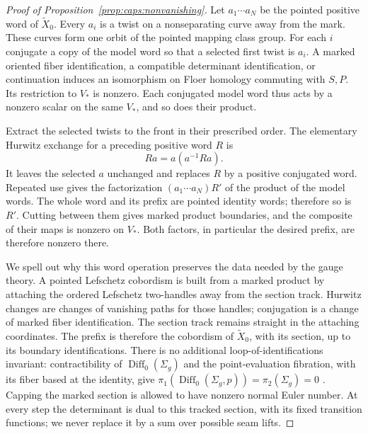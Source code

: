 \begin{proof}[Proof of Proposition~\ref{prop:caps:nonvanishing}]
Let $a_1\cdots a_N$ be the pointed positive word of
$\widetilde X_0$.  Every $a_i$ is a twist on a nonseparating curve away
from the mark.  These curves form one orbit of the pointed mapping class
group.  For each $i$ conjugate a copy of the model word so that a selected
first twist is $a_i$.  A marked oriented fiber identification, a compatible
determinant identification, or continuation induces an isomorphism on
Floer homology commuting with $S,P$.  Its restriction to $V_*$ is
nonzero.  Each conjugated model word thus acts by a nonzero scalar on the
same $V_*$, and so does their product.

Extract the selected twists to the front in their prescribed order.
The elementary Hurwitz exchange for a preceding positive word $R$ is
\begin{equation}\label{eq:caps:hurwitz}
                         Ra=a(a^{-1}Ra).
\end{equation}
It leaves the selected $a$ unchanged and replaces $R$ by a positive
conjugated word.  Repeated use gives the factorization
$(a_1\cdots a_N)R'$ of the product of the model words.  The whole word
and its prefix are pointed identity words; therefore so is $R'$.
Cutting between them gives marked product boundaries, and the composite
of their maps is nonzero on $V_*$.  Both factors, in particular the
desired prefix, are therefore nonzero there.

We spell out why this word operation preserves the data needed by the
gauge theory.  A pointed Lefschetz cobordism is built from a marked product
by attaching the ordered Lefschetz two-handles away from the section
track.  Hurwitz changes are changes of vanishing paths for those handles;
conjugation is a change of marked fiber identification.  The section
track remains straight in the attaching coordinates.  The prefix is
therefore the cobordism of $\widetilde X_0$, with its section, up to its
boundary identifications.  There is no additional loop-of-identifications
invariant: contractibility of $\operatorname{Diff}_0(\Sigma_g)$ and
the point-evaluation fibration, with its fiber based at the identity, give
$\pi_1(\operatorname{Diff}_0(\Sigma_g,p))=\pi_2(\Sigma_g)=0$
\cite[Theorem~1 and Section~1.1, Proposition~1]{Gramain1973}.
Capping the marked section is allowed to have nonzero normal Euler
number.  At every step the determinant is dual to this tracked section,
with its fixed transition functions; we never replace it by a sum over
possible seam lifts.


\end{proof}
